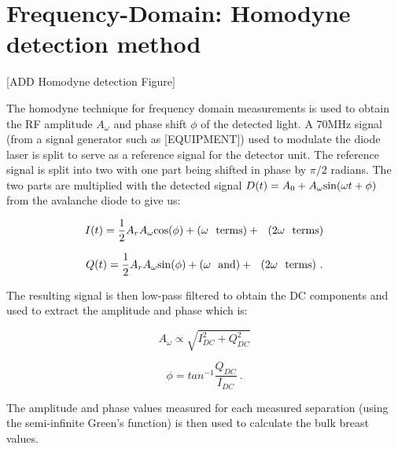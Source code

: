 \section{Frequency-Domain: Homodyne detection method}

[ADD Homodyne detection Figure]

The homodyne technique for frequency domain measurements is used to obtain the RF amplitude $A_{\omega}$ and phase shift $\phi$ of the detected light. A 70MHz signal (from a signal generator such as [EQUIPMENT]) used to modulate the diode laser is split to serve as a reference signal for the detector unit. The reference signal is split into two with one part being shifted in phase by $\pi/2$ radians. The two parts are multiplied with the detected signal $D(t) = A_0 + A_{\omega}{\rm sin}(\omega t + \phi)$ from the avalanche diode to give us:

\begin{equation}
\label{inphase}
I(t) = \frac{1}{2}A_rA_{\omega}{\rm cos}(\phi) + (\omega \ \ {\rm terms}) + \ \ (2\omega \ \ {\rm terms})
\end{equation}

\begin{equation}
\label{quadrature}
Q(t) = \frac{1}{2}A_rA_{\omega}{\rm sin}(\phi) + (\omega \ \ {\rm and}) + \ \  (2\omega \ \ {\rm terms} )\ .
\end{equation}

The resulting signal is then low-pass filtered to obtain the DC components and used to extract the amplitude and phase which is:

\begin{equation}
\label{homoamp}
A_{\omega} \propto \sqrt{I_{DC}^2 + Q_{DC}^2}
\end{equation}

\begin{equation}
\label{homophase}
\phi = tan^{-1}\frac{Q_{DC}}{I_{DC}} \ .
\end{equation}

The amplitude and phase values measured for each measured separation (using the semi-infinite Green's function) is then used to calculate the bulk breast values.